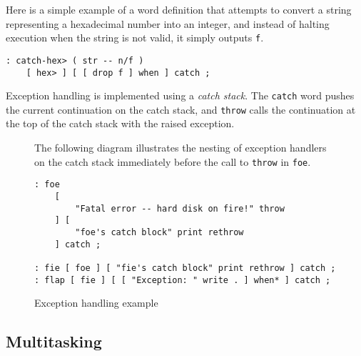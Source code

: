 \documentclass{book}
\begin{document}
Here is a simple example of a word definition that attempts to convert a string representing a hexadecimal number into an integer, and instead of halting execution when the string is not valid, it simply outputs \texttt{f}.
\begin{verbatim}
: catch-hex> ( str -- n/f )
    [ hex> ] [ [ drop f ] when ] catch ;
\end{verbatim}
Exception handling is implemented using a \emph{catch stack}. The \texttt{catch} word pushes the current continuation on the catch stack, and \texttt{throw} calls the continuation at the top of the catch stack with the raised exception.

\begin{figure}
\caption{Exception handling example}
The following diagram illustrates the nesting of exception handlers on the catch stack immediately before the call to \texttt{throw} in \texttt{foe}.
\begin{verbatim}
: foe
    [
        "Fatal error -- hard disk on fire!" throw
    ] [
        "foe's catch block" print rethrow
    ] catch ;

: fie [ foe ] [ "fie's catch block" print rethrow ] catch ;
: flap [ fie ] [ [ "Exception: " write . ] when* ] catch ;
\end{verbatim}

\begin{center}
\end{center}
\end{figure}

\subsection{Multitasking}\label{threads}
\end{document}
